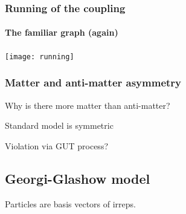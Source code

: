 \documentclass[english, fleqn]{beamer}
\begin{document}
\begin{frame}
    \frametitle{Running of the coupling}
    \framesubtitle{The familiar graph (again)}

    {
        \centering
        \texttt{[image: running]}
    }

    \parencite{Peskin/1997ez}
\end{frame}

\begin{frame}

    \frametitle{Matter and anti-matter asymmetry}

    Why is there more matter than anti-matter?

    Standard model is symmetric

    Violation via GUT process?
\end{frame}

\subsection{Georgi-Glashow model}

\begin{frame}
    Particles are basis vectors of irreps.
\end{frame}
\end{document}
